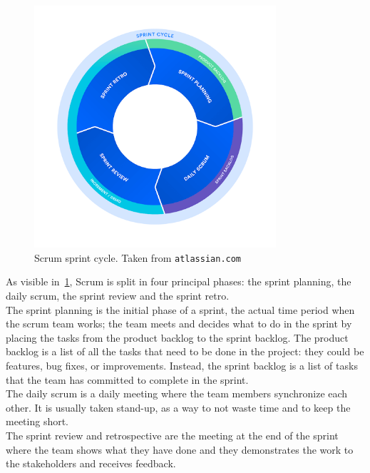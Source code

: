 \begin{figure}[h]
  \centering
  \includegraphics[width=0.8\textwidth]{chapters/04/assets/scrum}
  \caption{Scrum sprint cycle. Taken from \texttt{atlassian.com}}
  \label{fig:scrum-sprint-cycle}
\end{figure}

As visible in~\cref{fig:scrum-sprint-cycle}, Scrum is split in four principal phases: the sprint planning, the daily scrum, the sprint review and the sprint retro. \\
The sprint planning is the initial phase of a sprint, the actual time period when the scrum team works; the team meets and decides what to do in the sprint by placing the tasks from the product backlog to the sprint backlog. The product backlog is a list of all the tasks that need to be done in the project: they could be features, bug fixes, or improvements. Instead, the sprint backlog is a list of tasks that the team has committed to complete in the sprint. \\
The daily scrum is a daily meeting where the team members synchronize each other. It is usually taken stand-up, as a way to not waste time and to keep the meeting short.\\
The sprint review and retrospective are the meeting at the end of the sprint where the team shows what they have done and they demonstrates the work to the stakeholders and receives feedback.







